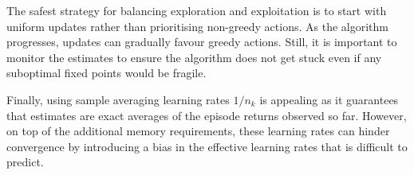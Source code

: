 

The safest strategy for balancing exploration and exploitation
is to start with uniform updates rather than prioritising non-greedy actions. As the algorithm progresses, updates can gradually favour greedy actions. Still, it is important to monitor the estimates to ensure the algorithm does not get stuck even if any suboptimal fixed points would be fragile.


Finally, using sample averaging learning rates $1/n_k$ is appealing as it guarantees that estimates are exact averages of the episode returns observed so far.
However, on top of the additional memory requirements, 
these learning rates can hinder convergence by introducing a bias in the effective learning rates that is difficult to predict.












